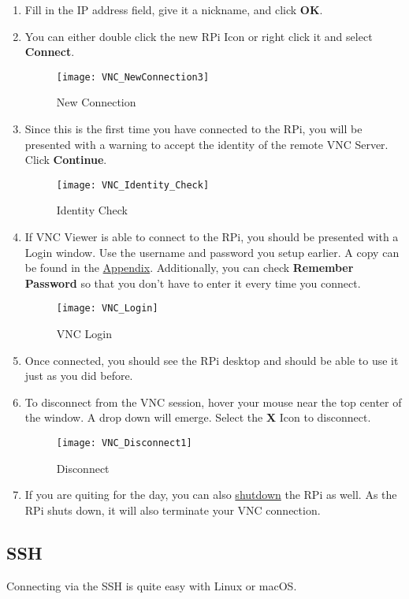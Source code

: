 \documentclass[
a4paper,
fontsize=14pt, %
pagesize, %
parskip=half-, %
]{scrartcl} %
\theoremstyle{mythmstyle} %
\begin{document}
\begin{enumerate}
\begin{figure}[h]
    \end{figure}
    \item Fill in the IP address field, give it a nickname, and click \textbf{OK}.
    \clearpage
    \item You can either double click the new RPi Icon or right click it and select \textbf{Connect}.
    \begin{figure}[h]
        \centering\texttt{[image: VNC\_NewConnection3]}
        \caption{New Connection}
    \end{figure}
    \item Since this is the first time you have connected to the RPi, you will be presented with a warning to accept the identity of the remote VNC Server.  Click \textbf{Continue}.
    \begin{figure}[h]
        \centering\texttt{[image: VNC\_Identity\_Check]}
        \caption{Identity Check}
    \end{figure}
    \clearpage
    \item If VNC Viewer is able to connect to the RPi, you should be presented with a Login window.  Use the username and password you setup earlier.  A copy can be found in the \hyperlink{password}{Appendix}.  Additionally, you can check \textbf{Remember Password} so that you don't have to enter it every time you connect.
    \begin{figure}[h]
        \centering\texttt{[image: VNC\_Login]}
        \caption{VNC Login}
    \end{figure}
    \item Once connected, you should see the RPi desktop and should be able to use it just as you did before.
    \item To disconnect from the VNC session, hover your mouse near the top center of the window.  A drop down will emerge.  Select the \textbf{X} Icon to disconnect.
    \begin{figure}[h]
        \centering\texttt{[image: VNC\_Disconnect1]}
        \caption{Disconnect}
    \end{figure}
    \item If you are quiting for the day, you can also \hyperlink{shutdown}{shutdown} the RPi as well.  As the RPi shuts down, it will also terminate your VNC connection.
\end{enumerate}
\clearpage
\subsection{SSH}
Connecting via the SSH is quite easy with Linux or macOS.  
\end{document}
